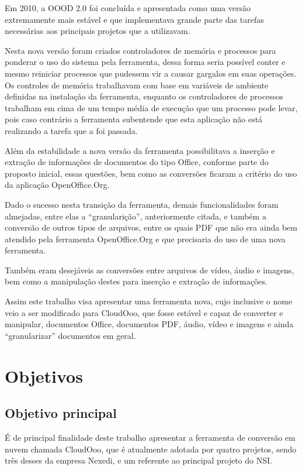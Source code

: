 Em 2010, a OOOD 2.0 foi concluída e apresentada como uma versão extremamente mais estável e que implementava grande parte das tarefas necessárias aos principais projetos que a utilizavam. 

Nesta nova versão foram criados controladores de memória e processos para ponderar o uso do sistema pela ferramenta, dessa forma seria possível conter e mesmo reiniciar processos que pudessem vir a causar gargalos em suas operações. Os controles de memória trabalhavam com base em variáveis de ambiente definidas na instalação da ferramenta, enquanto os controladores de processos trabalham em cima de um tempo média de execução que um processo pode levar, pois caso contrário a ferramenta subentende que esta aplicação não está realizando a tarefa que a foi passada.

Além da estabilidade a nova versão da ferramenta possibilitava a inserção e extração de informações de documentos do tipo Office, conforme parte do proposto inicial, essas questões, bem como as conversões ficaram a critério do uso da aplicação OpenOffice.Org.

Dado o sucesso nesta transição da ferramenta, demais funcionalidades foram almejadas, entre elas a ``granularição'', anteriormente citada, e também a conversão de outros tipos de arquivos, entre os quais PDF que não era ainda bem atendido pela ferramenta OpenOffice.Org e que precisaria do uso de uma nova ferramenta.

Também eram desejáveis as conversões entre arquivos de vídeo, áudio e imagens, bem como a manipulação destes para inserção e extração de informações.

Assim este trabalho visa apresentar uma ferramenta nova, cujo inclusive o nome veio a ser modificado para CloudOoo, que fosse estável e capaz de converter e manipular, documentos Office, documentos PDF, áudio, vídeo e imagens e ainda ``granularizar'' documentos em geral.


\section{Objetivos}

\subsection{Objetivo principal}

É de principal finalidade deste trabalho apresentar a ferramenta de conversão em nuvem chamada CloudOoo, que é atualmente adotada por quatro projetos, sendo três desses da empresa Nexedi, e um referente ao principal projeto do NSI.

